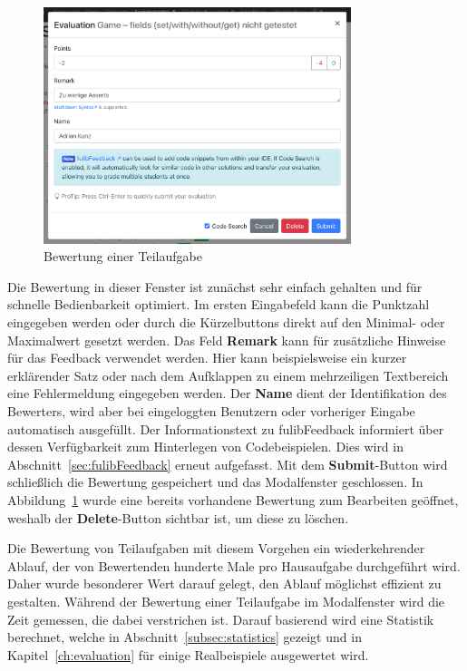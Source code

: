 \begin{figure}
    \centering
    \includegraphics[width=0.8\textwidth]{images/evaluation-modal}
    \caption{Bewertung einer Teilaufgabe}
    \label{fig:evaluation-modal}
\end{figure}

Die Bewertung in dieser Fenster ist zunächst sehr einfach gehalten und für schnelle Bedienbarkeit optimiert.
Im ersten Eingabefeld kann die Punktzahl eingegeben werden oder durch die Kürzelbuttons direkt auf den Minimal- oder Maximalwert gesetzt werden.
Das Feld \textbf{Remark} kann für zusätzliche Hinweise für das Feedback verwendet werden.
Hier kann beispielsweise ein kurzer erklärender Satz oder nach dem Aufklappen zu einem mehrzeiligen Textbereich eine Fehlermeldung eingegeben werden.
Der \textbf{Name} dient der Identifikation des Bewerters, wird aber bei eingeloggten Benutzern oder vorheriger Eingabe automatisch ausgefüllt.
Der Informationstext zu fulibFeedback informiert über dessen Verfügbarkeit zum Hinterlegen von Codebeispielen.
Dies wird in Abschnitt~\ref{sec:fulibFeedback} erneut aufgefasst.
Mit dem \textbf{Submit}-Button wird schließlich die Bewertung gespeichert und das Modalfenster geschlossen.
In Abbildung~\ref{fig:evaluation-modal} wurde eine bereits vorhandene Bewertung zum Bearbeiten geöffnet, weshalb der \textbf{Delete}-Button sichtbar ist, um diese zu löschen.

Die Bewertung von Teilaufgaben mit diesem Vorgehen ein wiederkehrender Ablauf, der von Bewertenden hunderte Male pro Hausaufgabe durchgeführt wird.
Daher wurde besonderer Wert darauf gelegt, den Ablauf möglichst effizient zu gestalten.
Während der Bewertung einer Teilaufgabe im Modalfenster wird die Zeit gemessen, die dabei verstrichen ist.
Darauf basierend wird eine Statistik berechnet, welche in Abschnitt~\ref{subsec:statistics} gezeigt und in Kapitel~\ref{ch:evaluation} für einige Realbeispiele ausgewertet wird.

